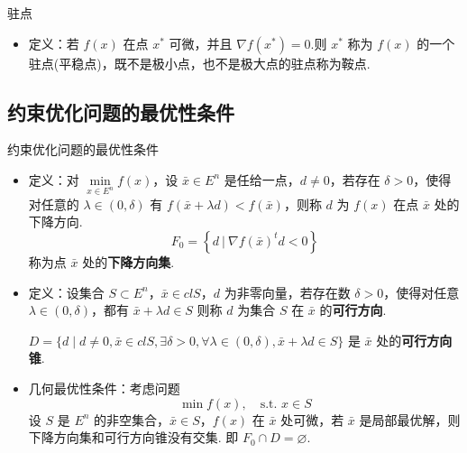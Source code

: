 \begin{remark}
    驻点\begin{itemize}
        \item 定义：若 $f(x)$ 在点 $x^*$ 可微，并且 $\nabla f(x^*) = 0$.则 $x^*$ 称为 $f(x)$ 的一个驻点(平稳点)，既不是极小点，也不是极大点的驻点称为鞍点.
    \end{itemize}
\end{remark}

\subsection{约束优化问题的最优性条件}
\begin{remark}
    约束优化问题的最优性条件
    \begin{itemize}
        \item 定义：对 $\underset{x \in E^n}{\min}f(x)$，设 $\bar{x} \in E^n$ 是任给一点，$d\neq 0$，若存在 $\delta > 0$，使得对任意的 $\lambda \in (0, \delta)$ 有 $f(\bar{x} + \lambda d) < f(\bar{x})$，则称 $d$ 为 $f(x)$ 在点 $\bar{x}$ 处的下降方向.\[F_0 = \left\{d\ |\ \nabla f(\bar{x})^td < 0\right\}\]称为点 $\bar{x}$ 处的\textbf{下降方向集}.
        \item 定义：设集合 $S \subset E^n$，$\bar{x} \in clS$，$d$ 为非零向量，若存在数 $\delta > 0$，使得对任意 $\lambda \in (0, \delta)$，都有 $\bar{x} + \lambda d \in S$ 则称 $d$ 为集合 $S$ 在 $\bar{x}$ 的\textbf{可行方向}. 
        
        $D=\{d \mid d \neq 0, \bar{x} \in c l S, \exists \delta>0, \forall \lambda \in(0, \delta), \bar{x}+\lambda d \in S\}$ 是 $\bar{x}$ 处的\textbf{可行方向锥}.
        \item 几何最优性条件：考虑问题\[\min f(x), \quad \text{s.t. } x \in S\]设 $S$ 是 $E^n$ 的非空集合，$\bar{x} \in S$，$f(x)$ 在 $\bar{x}$ 处可微，若 $\bar{x}$ 是局部最优解，则下降方向集和可行方向锥没有交集. 即 $F_0\cap D = \varnothing$.
    \end{itemize}
\end{remark}

